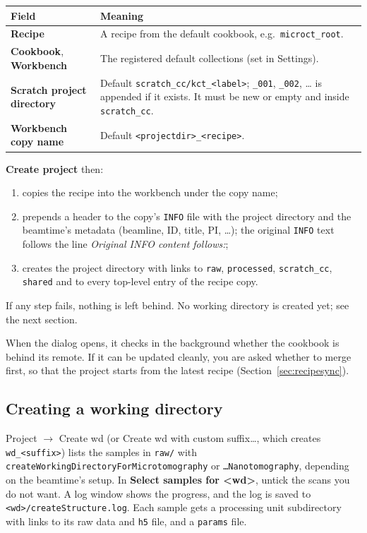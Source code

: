 \documentclass[11pt,a4paper]{article}
\newcommand{\cmd}[1]{\texttt{#1}}
\newcommand{\ui}[1]{\textsf{\textbf{#1}}}
\newcommand{\menu}[1]{\textsf{#1}}
\begin{document}
\begin{center}
\begin{tabularx}{\linewidth}{@{}l>{\raggedright\arraybackslash}X@{}}
\toprule
Field & Meaning \\
\midrule
\ui{Recipe} & A recipe from the default cookbook, e.g.\ \cmd{microct\_root}. \\
\ui{Cookbook}, \ui{Workbench} & The registered default collections (set in Settings). \\
\ui{Scratch project directory} & Default \cmd{scratch\_cc/kct\_<label>}; \cmd{\_001}, \cmd{\_002}, \ldots{} is appended if it exists. It must be new or empty and inside \cmd{scratch\_cc}. \\
\ui{Workbench copy name} & Default \cmd{<projectdir>\_<recipe>}. \\
\bottomrule
\end{tabularx}
\end{center}

\ui{Create project} then:

\begin{enumerate}
  \item copies the recipe into the workbench under the copy name;
  \item prepends a header to the copy's \cmd{INFO} file with the project directory and the beamtime's
    metadata (beamline, ID, title, PI, \ldots); the original \cmd{INFO} text follows the line
    \emph{Original INFO content follows:};
  \item creates the project directory with links to \cmd{raw}, \cmd{processed}, \cmd{scratch\_cc},
    \cmd{shared} and to every top-level entry of the recipe copy.
\end{enumerate}

If any step fails, nothing is left behind. No working directory is created yet; see the next
section.

When the dialog opens, it checks in the background whether the cookbook is behind its remote. If it
can be updated cleanly, you are asked whether to merge first, so that the project starts from the
latest recipe (Section~\ref{sec:recipesync}).

\subsection{Creating a working directory}

\menu{Project $\rightarrow$ Create wd} (or \menu{Create wd with custom suffix\ldots}, which creates
\cmd{wd\_<suffix>}) lists the samples in \cmd{raw/} with
\cmd{createWorkingDirectoryForMicrotomography} or \cmd{\ldots Nanotomography}, depending on the
beamtime's setup. In \ui{Select samples for <wd>}, untick the scans you do not want. A log window
shows the progress, and the log is saved to \cmd{<wd>/createStructure.log}. Each sample gets a
processing unit subdirectory with links to its raw data and \cmd{h5} file, and a \cmd{params}
file.
\end{document}
